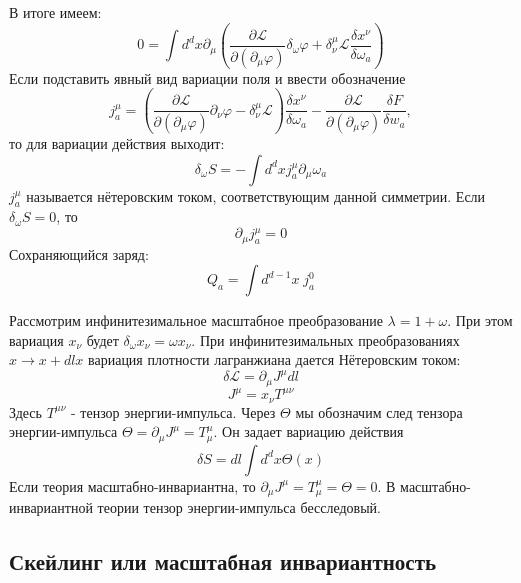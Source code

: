 \documentclass[a4paper,12pt]{article}
\theoremstyle{definition}
\theoremstyle{definition}
\theoremstyle{definition}
\begin{document}
В итоге имеем:
\begin{equation*}
  0=\int d^{d}x \partial_{\mu}\left(\frac{\partial \mathcal{L}}{\partial(\partial_{\mu}\varphi)}\delta_{\omega}\varphi +\delta^{\mu}_{\nu}\mathcal{L} \frac{\delta x^{\nu}}{\delta \omega_{a}}\right)
\end{equation*}
Если подставить явный вид вариации поля и ввести обозначение
\begin{equation*}
  j^{\mu}_{a}=\left(\frac{\partial \mathcal{L}}{\partial(\partial_{\mu}\varphi)}\partial_{\nu}\varphi -\delta^{\mu}_{\nu}\mathcal{L}\right) \frac{\delta x^{\nu}}{\delta \omega_{a}}-\frac{\partial \mathcal{L}}{\partial(\partial_{\mu}\varphi)}\frac{\delta F}{\delta w_{a}},
\end{equation*}
то для вариации действия выходит:
\begin{equation*}
  \delta_{\omega}S=-\int d^{d}x j^{\mu}_{a}\partial_{\mu}\omega_{a}
\end{equation*}
$j^{\mu}_{a}$ называется нётеровским током, соответствующим данной симметрии. 
Если $\delta_{\omega} S=0$, то
\begin{equation*}
  \partial_{\mu}j^{\mu}_{a}=0
\end{equation*}
Сохраняющийся заряд:
\begin{equation*}
  Q_{a}=\int d^{d-1}x\; j^{0}_{a}
\end{equation*}

 Рассмотрим инфинитезимальное масштабное преобразование $\lambda=1+\omega$. При этом вариация
 $x_{\nu}$ будет $\delta_{\omega}x_{\nu}=\omega x_{\nu}$.  При инфинитезимальных преобразованиях
 $x\to x+dl x$ вариация плотности лагранжиана дается Нётеровским током: 
\begin{equation}
  \label{eq:74}
  \delta\mathcal{L}=\partial_{\mu}J^{\mu}dl
\end{equation}
\begin{equation}
  \label{eq:75}
  J^{\mu}=x_{\nu}T^{\mu\nu}
\end{equation}
Здесь $T^{\mu\nu}$ - тензор энергии-импульса.  Через $\Theta$ мы обозначим след тензора
энергии-импульса $\Theta=\partial_{\mu}J^{\mu}=T_{\mu}^{\mu}$. Он задает вариацию действия 
\begin{equation}
  \label{eq:87}
  \delta S=dl \int d^d x \Theta(x)
\end{equation}
Если теория масштабно-инвариантна, то $\partial_{\mu}J^{\mu}=T_{\mu}^{\mu}=\Theta=0$. В
масштабно-инвариантной теории тензор энергии-импульса бесследовый. 


\subsection{Скейлинг или масштабная инвариантность}
\label{sec:scaling}
\end{document}
